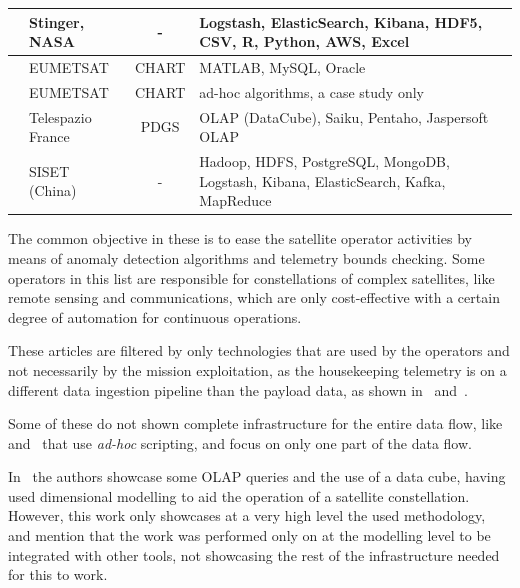 \begin{table}[htbp]
\begin{center}
\begin{tabular}{|C{11em}|C{6em}|c|C{10em}|}
      \hline
      \cite{mateikUsingBigData2017}                  & Stinger, NASA      & -                    & Logstash, ElasticSearch, Kibana, HDF5, CSV, R, Python, AWS, Excel                    \\
      \hline
      \cite{schulsterCHARTingFutureOffline2018}      & EUMETSAT           & CHART                & MATLAB, MySQL, Oracle                                                                \\
      \hline
      \cite{trollopeAnalysisAutomatedTechniques2018} & EUMETSAT           & CHART                & ad-hoc algorithms, a case study only \\
      \hline
      \cite{yvernesCopernicusGroundSegment2018}      & Telespazio France  & PDGS                 & OLAP (DataCube), Saiku, Pentaho, Jaspersoft OLAP                                     \\
      \hline
      \cite{zhangBigDataFramework2017}               & SISET (China)      & -                    & Hadoop, HDFS, PostgreSQL, MongoDB, Logstash, Kibana, ElasticSearch, Kafka, MapReduce \\
      \hline
    \end{tabular}
  \end{center}
\end{table}

The common objective in these is to ease the satellite operator activities by means of anomaly detection algorithms and telemetry bounds checking.
Some operators in this list are responsible for constellations of complex satellites, like remote sensing and communications, which are only cost-effective with a certain degree of automation for continuous operations.

These articles are filtered by only technologies that are used by the operators and not necessarily by the mission exploitation, as the housekeeping telemetry is on a different data ingestion pipeline than the payload data, as shown in~ and~.

Some of these do not shown complete infrastructure for the entire data flow, like~ and~ that use \textit{ad-hoc} scripting, and focus on only one part of the data flow.

In~ the authors showcase some OLAP queries and the use of a data cube, having used dimensional modelling to aid the operation of a satellite constellation. However, this work only showcases at a very high level the used methodology, and mention that the work was performed only on at the modelling level to be integrated with other tools, not showcasing the rest of the infrastructure needed for this to work.

